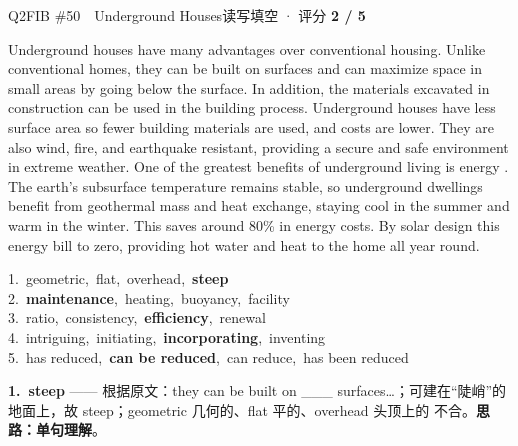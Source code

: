 \begin{qblock}{Q2\quad FIB \#50\ \ Underground Houses}{读写填空 · 评分 \textcolor{cAccent}{\bfseries 2 / 5}}
\begin{promptbox}
Underground houses have many advantages over conventional housing. Unlike conventional homes, they can be built on  surfaces and can maximize space in small areas by going below the surface. In addition, the materials excavated in construction can be used in the building process. Underground houses have less surface area so fewer building materials are used, and  costs are lower. They are also wind, fire, and earthquake resistant, providing a secure and safe environment in extreme weather. One of the greatest benefits of underground living is energy . The earth's subsurface temperature remains stable, so underground dwellings benefit from geothermal mass and heat exchange, staying cool in the summer and warm in the winter. This saves around 80\% in energy costs. By  solar design this energy bill  to zero, providing hot water and heat to the home all year round.
\end{promptbox}
{\small
1.\ geometric,\ flat,\ overhead,\ \textbf{steep}\\
2.\ \textbf{maintenance},\ heating,\ buoyancy,\ facility\\
3.\ ratio,\ consistency,\ \textbf{efficiency},\ renewal\\
4.\ intriguing,\ initiating,\ \textbf{incorporating},\ inventing\\
5.\ has reduced,\ \textbf{can be reduced},\ can reduce,\ has been reduced}
\begin{notebox}\footnotesize
\textbf{1.\ steep} —— 根据原文：they can be built on \_\_\_ surfaces…；可建在“陡峭”的地面上，故 steep；geometric 几何的、flat 平的、overhead 头顶上的 不合。\textbf{思路：单句理解}。\\[2pt]

\end{notebox}
\end{qblock}
